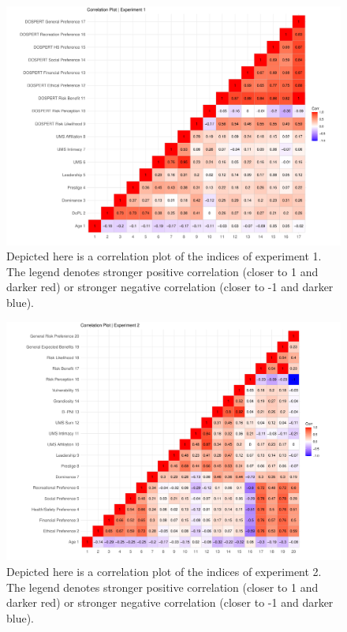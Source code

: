 \documentclass[
  donotrepeattitle,doc, 12pt, a4paper,floatsintext]{apa7}
\begin{document}
\begin{landscape}
\begin{figure}

{\centering \includegraphics{Output_Files/DoPL-Experiment_files/figure-latex/correlationExperiment1-1} 

}

\caption{Depicted here is a correlation plot of the indices of experiment 1. The legend denotes stronger positive correlation (closer to 1 and darker red) or stronger negative correlation (closer to -1 and darker blue).}\label{fig:correlationExperiment1}
\end{figure}
\newpage
\begin{figure}

{\centering \includegraphics{Output_Files/DoPL-Experiment_files/figure-latex/correlationExperiment2-1} 

}

\caption{Depicted here is a correlation plot of the indices of experiment 2. The legend denotes stronger positive correlation (closer to 1 and darker red) or stronger negative correlation (closer to -1 and darker blue).}\label{fig:correlationExperiment2}
\end{figure}
\end{landscape}
\end{document}
